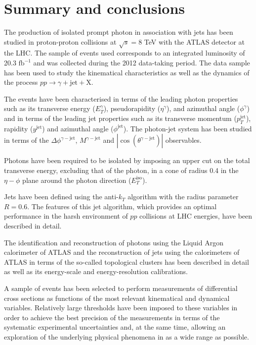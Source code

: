 \documentclass[12pt, twoside]{article}
\numberwithin{equation}{section}
\numberwithin{figure}{section}
\begin{document}
%
%
\newpage
\thispagestyle{empty}
\section{Summary and conclusions}
\label{sec:SummaryAndConclusions}
\vspace{1.0cm}

The production of isolated prompt photon in association with jets has been studied in proton-proton collisions at $\sqrt{s} = 8$ TeV with the ATLAS detector at the LHC. The sample of events used corresponds to an integrated luminosity of 20.3 $\text{fb}^{-1}$ and was collected during the 2012 data-taking period. The data sample has been used to study the kinematical characteristics as well as the dynamics of the process $pp \rightarrow{} \gamma + \text{jet} + \text{X}$.

The events have been characterised in terms of the leading photon properties such as its transverse energy ($E^{\gamma}_{T}$), pseudorapidity ($\eta^{\gamma}$), and azimuthal angle ($\phi^{\gamma}$) and in terms of the leading jet properties such as its transverse momentum ($p^{\text{jet}}_{T}$), rapidity ($y^{\text{jet}}$) and azimuthal angle ($\phi^{\text{jet}}$). The photon-jet system has been studied in terms of the $\Delta \phi^{\gamma-\text{jet}}$, $M^{\gamma-\text{jet}}$ and $\left| \cos \left( \theta^{\gamma-\text{jet}} \right) \right|$ observables.

Photons have been required to be isolated by imposing an upper cut on the total transverse energy, excluding that of the photon, in a cone of radius 0.4 in the $\eta - \phi$ plane around the photon direction ($E^{\text{iso}}_{T}$).

Jets have been defined using the anti-$k_{T}$ algorithm with the radius parameter $R = 0.6$. The features of this jet algorithm, which provides an optimal performance in the harsh environment of $pp$ collisions at LHC energies, have been described in detail.

The identification and reconstruction of photons using the Liquid Argon calorimeter of ATLAS and the reconstruction of jets using the calorimeters of ATLAS in terms of the so-called topological clusters has been described in detail as well as its energy-scale and energy-resolution calibrations.

A sample of events has been selected to perform measurements of differential cross sections as functions of the most relevant kinematical and dynamical variables. Relatively large thresholds have been imposed to these variables in order to achieve the best precision of the measurements in terms of the systematic experimental uncertainties and, at the same time, allowing an exploration of the underlying physical phenomena in as a wide range as possible.
\end{document}
